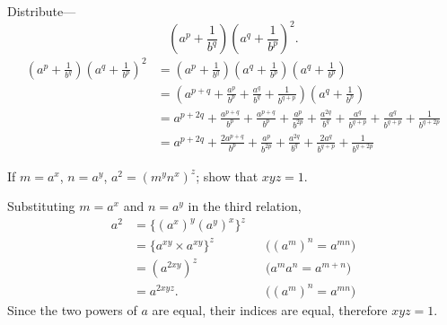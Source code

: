 \documentclass[DIN, pagenumber=false, fontsize=11pt, parskip=half]{scrartcl}
\begin{document}
\begin{problems}[from=1,step=1]
    \problem Distribute---
    \[
        \left(a^p + \frac{1}{b^q}\right) \left(a^q + \frac{1}{b^p}\right)^{2}.
    \]
    \answer 
    \begin{align*}
        \left(a^p + \frac{1}{b^q}\right)\left(a^q+\frac{1}{b^p}\right)^2 &= \left(a^p+\frac{1}{b^q}\right)\left(a^q+\frac{1}{b^p}\right)\left(a^q+\frac{1}{b^p}\right)\\ 
                                              &= \left(a^{p+q}+\frac{a^p}{b^p}+\frac{a^q}{b^q}+\frac{1}{b^{q+p}}\right)\left(a^q+\frac{1}{b^p}\right)\\ 
                                              &= a^{p+2q}+\frac{a^{p+q}}{b^p}+\frac{a^{p+q}}{b^p}+\frac{a^p}{b^{2p}}+\frac{a^{2q}}{b^q}+\frac{a^q}{b^{q+p}}+\frac{a^q}{b^{q+p}}+\frac{1}{b^{q+2p}}\\ 
                                              &= a^{p+2q}+\frac{2a^{p+q}}{b^p}+\frac{a^p}{b^{2p}}+\frac{a^{2q}}{b^q}+\frac{2a^q}{b^{q+p}}+\frac{1}{b^{q+2p}}
    \end{align*}

    \problem If $m = a^x$, $n = a^y$, $a^2 = (m^y n^x)^z$; show that $xyz = 1$.

    \answer Substituting $m = a^x$ and $n = a^y$ in the third relation,
    \begin{align*}
        a^2 &= \{(a^x)^y (a^y)^x\}^z \\
            &= \{a^{xy} \times a^{xy}\}^z && \text{($(a^m)^n = a^{mn}$)}\\
            &= (a^{2xy})^z && \text{($a^ma^n = a^{m+n}$)}\\
            &= a^{2xyz}. && \text{($(a^m)^n = a^{mn}$)}
    \end{align*}
    Since the two powers of $a$ are equal, their indices are equal, therefore $xyz = 1$.
\end{problems}
\end{document}
